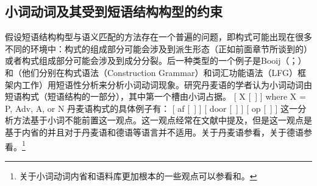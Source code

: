 \begin{exe}
\begin{xlist}[iv.]
\begin{exe}
\begin{xlist}[iv.]
\subsection{小词动词及其受到短语结构构型的约束}
\label{sec-particle-verbs-phrasal}

假设短语结构构型与语义匹配的方法存在一个普遍的问题，即构式可能出现在很多不同的环境中：构式的组成部分可能会涉及到派生形态（正如前面章节所谈到的）或者构式组成部分可能会涉及到成分分裂。后一种类型的一个例子是Booij（\citeyear[\S~2]{Booij2002a}；\citeyear{Booij2012a-u}）和\citet{Blom2005a}（他们分别在构式语法\indexcxgc（Construction Grammar）和词汇功能语法\indexlfgc（LFG）框架内工作）用短语性分析来分析小词动词现象。研究丹麦语的学者认为小词动词由短语构式（短语结构的一部分），其中第一个槽由小词占据。
\ea
{}[ X [~] ] where X = P, Adv, A, or N
\z
丹麦语构式的具体例子有：
\eal
\label{particle-konstruktionen}
\ex {}[ af   [~] ]
\ex {}[ door [~] ]
\ex {}[ op   [~] ]
\zl 
这一分析方法基于小词不能前置这一观点。这一观点经常在文献中提及，但是这一观点是基于内省的并且对于丹麦语和德语等语言并不适用。关于丹麦语参看，关于德语参看。\footnote{%
关于小词动词内省和语料库更加根本的一些观点可以参看和。
} 

\end{xlist}
\end{exe}
\end{xlist}
\end{exe}
